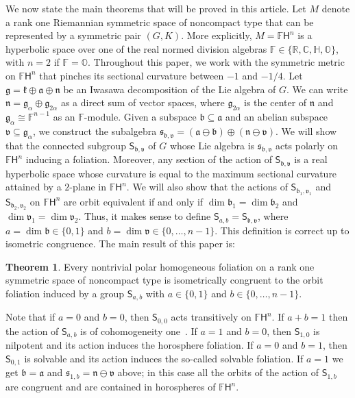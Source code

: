 \documentclass[12pt, a4paper]{amsart}
\newcommand{\g}{\mathfrak}
\newcommand{\s}{\mathsf}
\newcommand{\R}{\mathbb{R}}
\newcommand{\C}{\mathbb{C}}
\renewcommand{\H}{\mathbb{H}}
\renewcommand{\O}{\mathbb{O}}
\newcommand{\F}{\mathbb{F}}
\theoremstyle{definition}
\newtheorem{maintheorem}{Theorem}
\begin{document}
We now state the main theorems that will be proved in this article.
Let $M$ denote a rank one Riemannian symmetric space of noncompact type
that can be represented by a symmetric pair $(G,K)$.
More explicitly, $M=\F\s{H}^n$ is a hyperbolic space over one of the real normed
division algebras $\mathbb{F}\in\{\R,\C,\H,\O\}$, with $n=2$ if $\F=\O$.
Throughout this paper, we work with the symmetric metric on $\F\s{H}^n$ that pinches its
sectional curvature between $-1$ and $-1/4$.
Let $\g{g}=\g{k}\oplus\g{a}\oplus\g{n}$ be an Iwasawa decomposition of the Lie algebra of $G$.
We can write $\g{n}=\g{g}_\alpha\oplus\g{g}_{2\alpha}$ as a direct sum of vector spaces, 
where $\g{g}_{2\alpha}$ is the center of $\g{n}$ and $\g{g}_\alpha\cong\mathbb{F}^{n-1}$ as an $\mathbb{F}$-module.
Given a subspace $\g{b}\subseteq \g{a}$ and an abelian subspace $\g{v}\subseteq \g{g}_\alpha$, we construct the subalgebra $\g{s}_{\g{b},\g{v}}=(\g{a}\ominus\g{b})\oplus(\g{n}\ominus \g{v})$.
We will show that the connected subgroup $\s{S}_{\g{b},\g{v}}$ of $G$ whose Lie algebra is 
$\g{s}_{\g{b},\g{v}}$ acts polarly on $\F\s{H}^n$ inducing a foliation.
Moreover, any section of the action of $\s{S}_{\g{b},\g{v}}$ is a real hyperbolic space whose curvature is equal to the maximum sectional curvature attained by a $2$-plane in $\F\s{H}^n$.
We will also show that the actions of $\s{S}_{\g{b}_1,\g{v}_1}$ and $\s{S}_{\g{b}_2,\g{v}_2}$ on $\mathbb{F}\s{H}^n$
are orbit equivalent if and only if $\dim\g{b}_1=\dim\g{b}_2$ and $\dim\g{v}_1=\dim\g{v}_2$.
Thus, it makes sense to define $\s{S}_{a,b}=\s{S}_{\g{b},\g{v}}$, 
where $a=\dim\g{b}\in\{0,1\}$ and $b=\dim\g{v}\in\{0,\dots,n-1\}$.
This definition is correct up to isometric congruence.
The main result of this paper is:

\begin{maintheorem}\label{th:main-short}
Every nontrivial polar homogeneous foliation on a rank one symmetric space of noncompact type is isometrically congruent to the orbit foliation induced by a group $\s{S}_{a,b}$ with $a\in\{0,1\}$ and $b\in\{0,\dots,n-1\}$.
\end{maintheorem}

Note that if $a=0$ and $b=0$, then $\s{S}_{0,0}$ acts transitively on $\F\s{H}^n$.
If $a+b=1$ then the action of $\s{S}_{a,b}$ is of cohomogeneity one~\cite{BerndtTamaru03}.
If $a=1$ and $b=0$, then $\s{S}_{1,0}$ is nilpotent and its action induces the horosphere foliation.
If $a=0$ and $b=1$, then $\s{S}_{0,1}$ is solvable and its action induces the so-called solvable foliation.
If $a=1$ we get $\g{b}=\g{a}$ and $\g{s}_{1,b}=\g{n}\ominus\g{v}$ above;
in this case all the orbits of the action of $\s{S}_{1,b}$ are congruent and are contained in horospheres of $\F\s{H}^n$.
\end{document}
